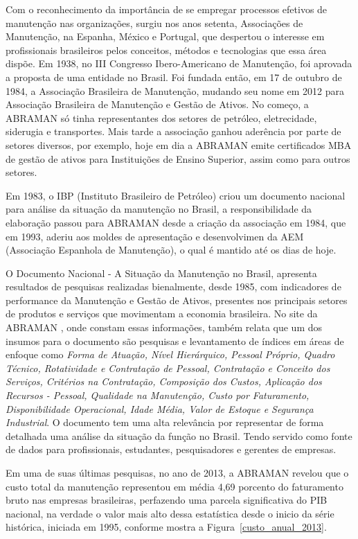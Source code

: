 Com o reconhecimento da importância de se empregar processos efetivos de manutenção nas organizações, surgiu nos anos setenta, Associações de Manutenção, na Espanha, México e Portugal, que despertou o interesse em profissionais brasileiros pelos conceitos, métodos e tecnologias que essa área dispõe. Em 1938, no III Congresso Ibero-Americano de Manutenção, foi aprovada a proposta de uma entidade no Brasil. Foi fundada então, em 17 de outubro de 1984, a Associação Brasileira de Manutenção, mudando seu nome em 2012 para Associação Brasileira de Manutenção e Gestão de Ativos. No começo, a ABRAMAN só tinha representantes dos setores de petróleo, eletrecidade, siderugia e transportes. Mais tarde a associação ganhou aderência por parte de setores diversos, por exemplo, hoje em dia a ABRAMAN emite certificados MBA de gestão de ativos para Instituições de Ensino Superior, assim como para outros setores. 

Em 1983, o IBP (Instituto Brasileiro de Petróleo) criou um documento nacional para análise da situação da manutenção no Brasil, a responsibilidade da elaboração passou para ABRAMAN desde a criação da associação em 1984, que em 1993, aderiu aos moldes de apresentação e desenvolvimen da AEM (Associação Espanhola de Manutenção), o qual é mantido até os dias de hoje.  

O Documento Nacional - A Situação da Manutenção no Brasil, apresenta resultados de pesquisas realizadas bienalmente, desde 1985, com indicadores de performance da Manutenção e Gestão de Ativos, presentes nos principais setores de produtos e serviços que movimentam a economia brasileira. No site da ABRAMAN \cite{abraman}, onde constam essas informações, também relata que um dos insumos para o documento são pesquisas e levantamento de índices em áreas de enfoque como \emph{Forma de Atuação, Nível Hierárquico, Pessoal Próprio, Quadro Técnico, Rotatividade e Contratação de Pessoal, Contratação e Conceito dos Serviços, Critérios na Contratação, Composição dos Custos, Aplicação dos Recursos - Pessoal, Qualidade na Manutenção, Custo por Faturamento, Disponibilidade Operacional, Idade Média, Valor de Estoque e Segurança Industrial}. O documento tem uma alta relevância por representar de forma detalhada uma análise da situação da função no Brasil. Tendo servido como fonte de dados para profissionais, estudantes, pesquisadores e gerentes de empresas.

Em uma de suas últimas pesquisas, no ano de 2013, a ABRAMAN revelou que o custo total da manutenção representou em média 4,69 porcento do faturamento bruto nas empresas brasileiras, perfazendo uma parcela significativa do PIB nacional, na verdade o valor mais alto dessa estatística desde o inicio da série histórica, iniciada em 1995, conforme mostra a Figura~\ref{custo_anual_2013}.

